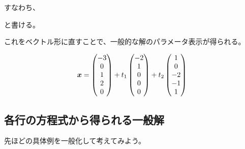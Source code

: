 \documentclass[../../../topic_linear-algebra]{subfiles}
\begin{document}
\begin{center}
\end{center}

すなわち、

\begin{center}
\end{center}

と書ける。

\br

これをベクトル形に直すことで、一般的な解のパラメータ表示が得られる。

\begin{equation*}
  \vb*{x} = \begin{pmatrix}
    -3 \\
    0  \\
    1  \\
    2  \\
    0
  \end{pmatrix} + t_1 \begin{pmatrix}
    -2 \\
    1  \\
    0  \\
    0  \\
    0
  \end{pmatrix} + t_2 \begin{pmatrix}
    1  \\
    0  \\
    -2 \\
    -1 \\
    1
  \end{pmatrix}
\end{equation*}

\subsection{各行の方程式から得られる一般解}

先ほどの具体例を一般化して考えてみよう。

\br
\end{document}
